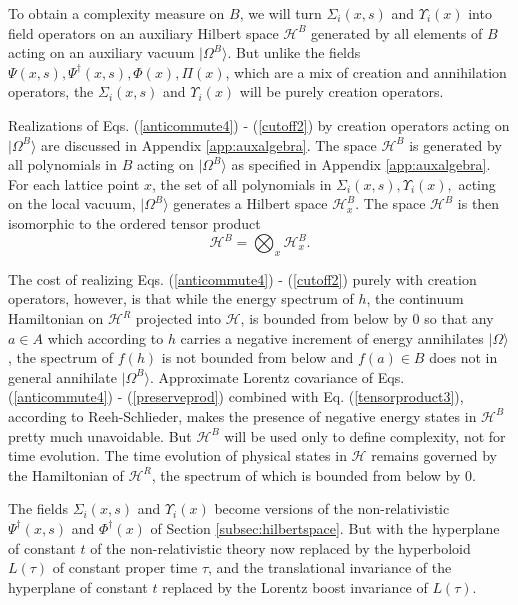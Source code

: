 \documentclass[12pt,amsmath,amssymb,onecolumn]{revtex4-2}
\begin{document}
To obtain a complexity measure on $B$, we will turn $\Sigma_i( x, s)$ and  $\Upsilon_i( x)$
into field operators on an auxiliary Hilbert space $\mathcal{H}^B$ 
generated by all elements of $B$ acting
on an auxiliary vacuum $|\Omega^B \rangle $.
But unlike the fields $\Psi(x, s), \Psi^\dagger(x,s), \Phi( x), \Pi(x)$,
which are a mix of creation and annihilation operators,
the $\Sigma_i( x, s)$ and  $\Upsilon_i( x)$ will be
purely creation operators. 

Realizations of Eqs. (\ref{anticommute4}) - (\ref{cutoff2}) by
creation operators acting on $|\Omega^B \rangle $ are discussed in
Appendix \ref{app:auxalgebra}.  The space $\mathcal{H}^B$
is generated by all polynomials in 
$B$ acting on $|\Omega^B \rangle $ as specified in Appendix \ref{app:auxalgebra}.
For each lattice point $x$, the set of all polynomials in 
$\Sigma_i( x, s), \Upsilon_i( x),$
acting on the local vacuum, $|\Omega^B \rangle $ generates a Hilbert space $\mathcal{H}^B_x$.
The space $\mathcal{H}^B$
is then isomorphic to the ordered tensor product
\begin{equation}
\label{tensorproduct3}
\mathcal{H}^B = \bigotimes_x \mathcal{H}^B_x.
\end{equation}

The cost of realizing Eqs. (\ref{anticommute4}) - (\ref{cutoff2})
purely with creation operators, however, is that
while the energy spectrum of $h$, the continuum Hamiltonian on $\mathcal{H}^R$
projected into $\mathcal{H}$,
is bounded from below by 0 so that any $a \in A$
which according to $h$ carries a negative increment of energy annihilates
$|\Omega \rangle $, the spectrum of $f(h)$ is not bounded from below
and $f(a) \in B$ does not in general
annihilate $|\Omega^B \rangle $.
Approximate Lorentz covariance of Eqs. (\ref{anticommute4}) - (\ref{preserveprod})
combined with Eq. (\ref{tensorproduct3}), according to Reeh-Schlieder,
makes the presence of negative energy states in $\mathcal{H}^B$
pretty much unavoidable. 
But $\mathcal{H}^B$ will
be used only to define complexity, not for time evolution.
The time evolution of
physical states in $\mathcal{H}$ remains governed by the Hamiltonian of $\mathcal{H}^R$, the
spectrum of which is bounded from below by 0.


The fields $\Sigma_i( x, s)$ and $\Upsilon_i( x)$
become versions of the non-relativistic 
$\Psi^\dagger( x, s)$ and $\Phi^\dagger( x)$ of Section \ref{subsec:hilbertspace}.
But with the hyperplane of constant $t$ of the non-relativistic theory now
replaced by the hyperboloid $L(\tau)$ of constant proper time $\tau$, and the
translational invariance of the hyperplane of constant $t$
replaced by the Lorentz boost invariance of $L(\tau)$.
\end{document}
